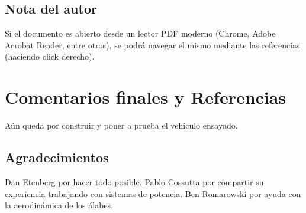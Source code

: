\documentclass[11pt, titlepage]{article}
\begin{document}
\subsection*{Nota del autor}
Si el documento es abierto desde un lector PDF moderno (Chrome, Adobe Acrobat Reader, entre otros), se podrá navegar el mismo mediante las referencias (haciendo click derecho).

\newpage



\null\newpage
\clearpage





\null\newpage
\clearpage




\null\newpage
\clearpage



\null\newpage
\clearpage





\section{Comentarios finales y Referencias}
Aún queda por construir y poner a prueba el vehículo ensayado.

\subsection*{Agradecimientos}
Dan Etenberg por hacer todo posible. Pablo Cossutta por compartir su experiencia trabajando con sistemas de potencia. Ben Romarowski por ayuda con la aerodinámica de los álabes.



% 
%

\null\newpage
\clearpage


\end{document}
